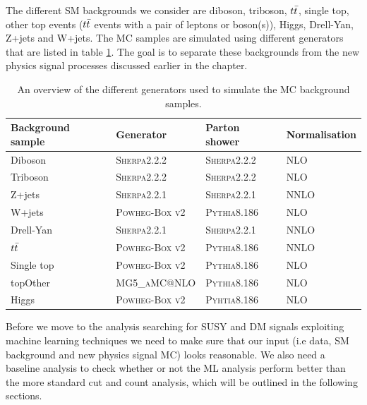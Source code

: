The different SM backgrounds we consider are diboson, triboson, $t\Bar{t}$, single top, other top events ($t\Bar{t}$ events with a pair of leptons or boson(s)), Higgs, Drell-Yan, Z+jets and W+jets. The MC samples are simulated using different generators that are listed in table \ref{tab:bkg_samples}. The goal is to separate these backgrounds from the new physics signal processes discussed earlier in the chapter. 

\begin{table}[H]
    \centering
    \begin{tabular}{l l l l} \toprule
        \textbf{Background sample} & \textbf{Generator} & \textbf{Parton shower} & \textbf{Normalisation}\\
        \midrule
        \midrule
        Diboson & \textsc{Sherpa2.2.2}\cite{sherpa2_1, sherpa1_2, sherpa1_3} & \textsc{Sherpa2.2.2} & NLO \cite{NLO}\\
        Triboson & \textsc{Sherpa2.2.2} & \textsc{Sherpa2.2.2} & NLO \\
        Z+jets & \textsc{Sherpa2.2.1} \cite{sherpa1_1, sherpa1_2, sherpa1_3} & \textsc{Sherpa2.2.1} & NNLO \cite{NNLO}\\
        W+jets & \textsc{Powheg-Box v2}\cite{49Z, 50Z} & \textsc{Pythia8.186} \cite{49} & NLO\\
        Drell-Yan & \textsc{Sherpa2.2.1} & \textsc{Sherpa2.2.1} & NNLO\\
        $t\Bar{t}$ & \textsc{Powheg-Box v2} & \textsc{Pythia8.186} & NNLO\\
        Single top & \textsc{Powheg-Box v2} & \textsc{Pythia8.186} & NLO\\
        topOther & \textsc{MG5\_aMC@NLO} \cite{48} & \textsc{Pythia8.186} & NLO\\
        Higgs & \textsc{Powheg-Box v2} & \textsc{Pyhtia8.186} & NLO\\
        \bottomrule
    \end{tabular}
    \caption{An overview of the different generators used to simulate the MC background samples.}
    \label{tab:bkg_samples}
\end{table}

Before we move to the analysis searching for SUSY and DM signals exploiting machine learning techniques we need to make sure that our input (i.e data, SM background and new physics signal MC) looks reasonable. We also need a baseline analysis to check whether or not the ML analysis perform better than the more standard cut and count analysis, which will be outlined in the following sections.



